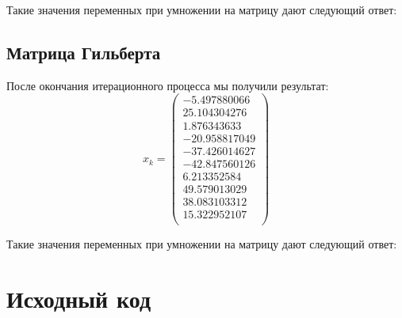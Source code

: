 \documentclass[../../report.tex]{subfiles}
\begin{document}
Такие значения переменных при умножении на матрицу дают следующий ответ:


\subsection{Матрица Гильберта}
После окончания итерационного процесса мы получили результат:
\[
x_{k} = 
\begin{pmatrix}
    -5.497880066 \\
    25.104304276 \\
     1.876343633 \\
   -20.958817049 \\
   -37.426014627 \\
   -42.847560126 \\
     6.213352584 \\
    49.579013029 \\
    38.083103312 \\
    15.322952107 \\
\end{pmatrix}
\]

Такие значения переменных при умножении на матрицу дают следующий ответ:


\section{Исходный код}
\end{document}
